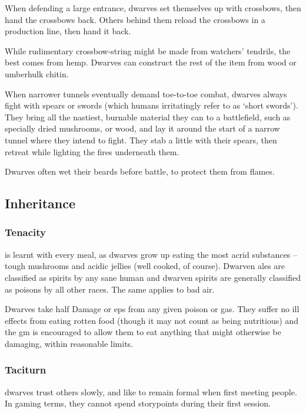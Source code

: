 \begin{multicols}{2}
When defending a large entrance, dwarves set themselves up with crossbows, then hand the crossbows back.
Others behind them reload the crossbows in a production line, then hand it back.

While rudimentary crossbow-string might be made from watchers' tendrils, the best comes from hemp.
Dwarves can construct the rest of the item from wood or umberhulk chitin.

When narrower tunnels eventually demand toe-to-toe combat, dwarves always fight with spears or swords (which humans irritatingly refer to as `short swords').
They bring all the nastiest, burnable material they can to a battlefield, such as specially dried mushrooms, or wood, and lay it around the start of a narrow tunnel where they intend to fight.
They stab a little with their spears, then retreat while lighting the fires underneath them.

Dwarves often wet their beards before battle, to protect them from flames.

\subsection{Inheritance}

\subsubsection[Tenacity: dwarves take only half the usual penalties from rotten food, poisons, or foul air.]{Tenacity}
\label{dwarvenInheritance}
is learnt with every meal, as dwarves grow up eating the most acrid substances -- tough mushrooms and acidic jellies (well cooked, of course).
Dwarven ales are classified as spirits by any sane human and dwarven spirits are generally classified as poisons by all other races.
The same applies to bad air.

Dwarves take half Damage or \glspl{ep} from any given poison or gas.
They suffer no ill effects from eating rotten food (though it may not count as being nutritious) and the \gls{gm} is encouraged to allow them to eat anything that might otherwise be damaging, within reasonable limits.

\subsubsection{Taciturn}
dwarves trust others slowly, and like to remain formal when first meeting people.
In gaming terms, they cannot spend \glspl{storypoint} during their first session.


\end{multicols}

